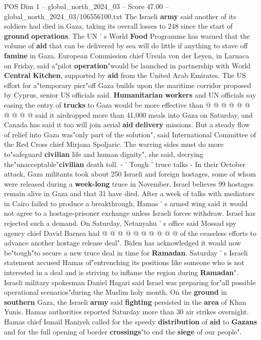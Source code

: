\begin{textsample}{POS Dim 1 – global\_north\_2024\_03 – Score 47.00 – global\_north\_2024\_03/106556100.txt}
The Israeli \textbf{army} said another of its soldiers had died in Gaza, taking its overall losses to 248 since the start of \textbf{ground} \textbf{operations}.
The UN ' s World \textbf{Food} Programme has warned that the volume of \textbf{aid} that can be delivered by sea will do little if anything to stave off \textbf{famine} in Gaza.
European Commission chief Ursula von der Leyen, in Larnaca on Friday, said a"pilot \textbf{operation}"would be launched in partnership with World \textbf{Central} \textbf{Kitchen}, supported by \textbf{aid} from the United Arab Emirates.
The US effort for a"temporary pier"off Gaza builds upon the maritime corridor proposed by Cyprus, senior US officials said. \textbf{Humanitarian} \textbf{workers} and UN officials say easing the entry of \textbf{trucks} to Gaza would be more effective than @ @ @ @ @ @ @ @ @ @ said it airdropped more than 41,000 meals into Gaza on Saturday, and Canada has said it too will join aerial \textbf{aid} \textbf{delivery} missions.
But a steady flow of relief into Gaza was"only part of the solution", said International Committee of the Red Cross chief Mirjana Spoljaric.
The warring sides must do more to"safeguard \textbf{civilian} life and human dignity", she said, decrying the"unacceptable"\textbf{civilian} death toll. - ' Tough ' truce talks - In their October attack, Gaza militants took about 250 Israeli and foreign hostages, some of whom were released during a \textbf{week-long} truce in November.
Israel believes 99 hostages remain alive in Gaza and that 31 have died.
After a week of talks with mediators in Cairo failed to produce a breakthrough, Hamas ' s armed wing said it would not agree to a hostage-prisoner exchange unless Israeli forces withdraw.
Israel has rejected such a demand.
On Saturday, Netanyahu ' s office said Mossad spy agency chief David Barnea had @ @ @ @ @ @ @ @ @ @ of the ceaseless efforts to advance another hostage release deal".
Biden has acknowledged it would now be"tough"to secure a new truce deal in time for \textbf{Ramadan}.
Saturday ' s Israeli statement accused Hamas of"entrenching its positions like someone who is not interested in a deal and is striving to inflame the region during \textbf{Ramadan}".
Israeli military spokesman Daniel Hagari said Israel was preparing for"all possible operational scenarios"during the Muslim holy month.
On the \textbf{ground} in \textbf{southern} Gaza, the Israeli \textbf{army} said \textbf{fighting} persisted in the \textbf{area} of Khan Yunis.
Hamas authorities reported Saturday more than 30 air strikes overnight.
Hamas chief Ismail Haniyeh called for the speedy \textbf{distribution} of \textbf{aid} to \textbf{Gazans} and for the full opening of border \textbf{crossings}"to end the \textbf{siege} of our people".

\end{textsample}
